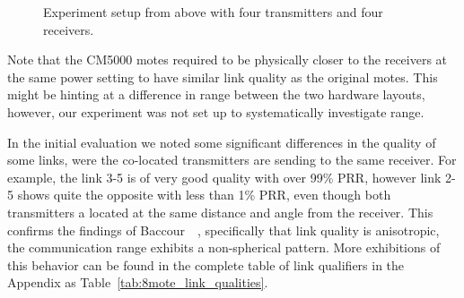 \begin{figure}[t]
	\centering
	\caption{Experiment setup from above with four transmitters and four receivers.}
	\label{fig:8mote_experiment_setup}
\end{figure}

Note that the CM5000 motes required to be physically closer to the receivers at the same power setting to have similar link quality as the original motes.
This might be hinting at a difference in range between the two hardware layouts, however, our experiment was not set up to systematically investigate range.

In the initial evaluation we noted some significant differences in the quality of some links, were the co-located transmitters are sending to the same receiver.
For example, the link 3-5 is of very good quality with over 99\% \ac{PRR}, however link 2-5 shows quite the opposite with less than 1\% \ac{PRR}, even though both transmitters a located at the same distance and angle from the receiver.
This confirms the findings of Baccour~\etal~\cite{Baccour2012}, specifically that link quality is anisotropic, \ie the communication range exhibits a non-spherical pattern.
More exhibitions of this behavior can be found in the complete table of link qualifiers in the Appendix as Table~\ref{tab:8mote_link_qualities}.

